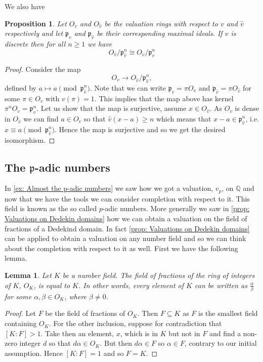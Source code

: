 \documentclass{article}
\newtheorem{proposition}{Proposition}[section]
\newtheorem{lemma}{Lemma}[section]
\newcommand{\mfrak}[1]{\mathfrak{#1}}
\newcommand{\mbb}[1]{\mathbb{#1}}
\numberwithin{equation}{section}
\begin{document}
We also have
\begin{proposition}\label{prop: Isomorphism of residue fields valued field and its completion}
    Let $O_v$ and $O_{\hat v}$ be the valuation rings with respect to $v$ and $\hat v$ respectively and let $\mfrak p_v$ and $\mfrak p_{\hat v}$ be their corresponding maximal ideals. 
    If $v$ is discrete then for all $n \geq 1$ we have
    $$O_{\hat v} / \mfrak p_{\hat v}^n \cong O_v / \mfrak p_v^n$$
\end{proposition}
\begin{proof}
    Consider the map $$O_v \to O_{\hat v} / \mfrak p_{\hat v}^n,$$ defined by $a \mapsto a \pmod {\mfrak p_{\hat v}^n}$. Note that we can write $\mfrak p_v = \pi O_v$ and $\mfrak p_{\hat v} = \pi O_{\hat v}$ for some $\pi \in O_v$ with $v(\pi) = 1$. This implies that the map above has kernel $\pi^n O_v = \mfrak p_v^n$. Let us show that the map is surjective, assume $x \in O_{\hat v}$. As $O_v$ is dense in $O_{\hat v}$ we can find $a \in O_v$ so that $\hat v(x - a) \geq n$ which means that $x - a \in \mfrak p_{\hat v}^n$, i.e. $x \equiv a \pmod {\mfrak p_{\hat v}^n}$. Hence the map is surjective and so we get the desired isomorphism.
\end{proof}

\subsection{The $\mfrak p$-adic numbers}

In \cref{ex: Almost the p-adic numbers} we saw how we got a valuation, $v_p$, on $\mbb Q$ and now that we have the tools we can consider completion with respect to it. This field is known as the so called $p$-adic numbers. More generally we saw in \cref{prop: Valuations on Dedekin domains} how we can obtain a valuation on the field of fractions of a Dedekind domain. In fact \cref{prop: Valuations on Dedekin domains} can be applied to obtain a valuation on any number field and so we can think about the completion with respect to it as well. First we have the following lemma.

\begin{lemma} \label{lem: Field of fractions of ring of integers is number field}
    Let $K$ be a number field. The field of fractions of the ring of integers of $K$, $O_K$, is equal to $K$. In other words, every element of $K$ can be written as $\frac{\alpha}{\beta}$ for some $\alpha, \beta \in O_K$, where $\beta \neq 0$.
\end{lemma}
\begin{proof}
    Let $F$ be the field of fractions of $O_K$. Then $F \subseteq K$ as $F$ is the smallest field containing $O_K$. For the other inclusion, suppose for contradiction that $[K : F] > 1$. Take then an element, $x$, which is in $K$ but not in $F$ and find a non-zero integer $d$ so that $d \alpha \in O_K$. But then $d \alpha \in F$ so $\alpha \in F$, contrary to our initial assumption. Hence $[K : F] = 1$ and so $F = K$.
\end{proof}
\end{document}
